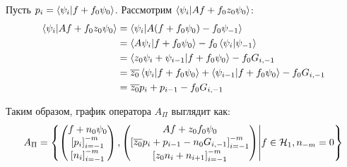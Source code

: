 Пусть $p_i = \ip{\psi_i}{f + f_0 \psi_0}$. Рассмотрим $\ip{\psi_i}{A f + f_0 z_0 \psi_0}$:
\begin{align*}
\ip{\psi_i}{A f + f_0 z_0 \psi_0}
&= \ip{\psi_i}{A (f + f_0 \psi_0) - f_0 \psi_{-1}} \\
&= \ip{A \psi_i}{f + f_0 \psi_0} - f_0 \ip{\psi_i}{\psi_{-1}} \\
&= \ip{z_0 \psi_i + \psi_{i - 1}}{f + f_0 \psi_0} - f_0 G_{i, -1} \\
&= \cconj{z_0} \ip{\psi_i}{f + f_0 \psi_0} + \ip{\psi_{i - 1}}{f + f_0 \psi_0} - f_0 G_{i, -1} \\
&= \cconj{z_0} p_{i} + p_{i - 1} - f_0 G_{i, -1}
\end{align*}

Таким образом, график оператора $A_\Pi$ выглядит как:
\[
A_\Pi = \left\{
\begin{pmatrix}
f + n_0 \psi_0 \\
\left[ p_i \right]_{i = -1}^{-m} \\
\left[ n_i \right]_{i = -1}^{-m} \\
\end{pmatrix},
\begin{pmatrix}
A f + z_0 f_0 \psi_0 \\
\left[ \overline{z_0} p_i + p_{i - 1} - n_0 G_{i, -1} \right]_{i = -1}^{-m} \\
\left[ z_0 n_i + n_{i + 1} \right]_{i = -1}^{-m} \\
\end{pmatrix}
\middle|
f \in \mathcal{H}_{1},
n_{-m} = 0
\right\}
\]

